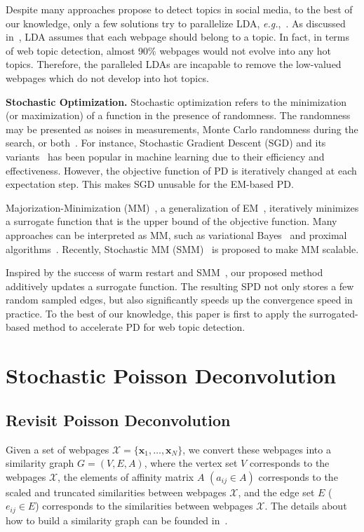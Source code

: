 \documentclass[runningheads]{llncs}
\begin{document}
Despite many approaches propose to detect topics in social media, to the best of our knowledge, only a few solutions try to parallelize LDA, \emph{e.g.},~\cite{wang-2009-PLDA,chen-2015-WarpLDA,Liu-2011-PLDA+}. As discussed in~\cite{pang-2013-unsupervised,pang-tao-2016-lpd}, LDA assumes that each webpage should belong to a topic. In fact, in terms of web topic detection, almost 90\% webpages would not evolve into any hot topics. Therefore, the paralleled LDAs are incapable to remove the low-valued webpages which do not develop into hot topics.

\textbf{Stochastic Optimization.} Stochastic optimization refers to the minimization (or maximization) of a function in the presence of randomness. The randomness may be presented as noises in measurements, Monte Carlo randomness during the search, or both~\cite{hannah-2015-Stochastic}. For instance, Stochastic Gradient Descent (SGD) and its variants~\cite{mairal-2013-optimization,johnson-2013-sgd-accelerating,Roux-2012-sgd-exponential} has been popular in machine learning due to their efficiency and effectiveness. However, the objective function of PD is iteratively changed at each expectation step. This makes SGD unusable for the EM-based PD.

Majorization-Minimization (MM)~\cite{lange-2000-optimization}, a generalization of EM~\cite{cappe-2009-online-EM,neal-1998-view-EM}, iteratively minimizes a surrogate function that is the upper bound of the objective function. Many approaches can be interpreted as MM, such as variational Bayes~\cite{Wainwright-2008-variational-bayes} and proximal algorithms~\cite{beck-2009-fastshrinkage}. Recently, Stochastic MM (SMM)~\cite{mairal-2013-SMM} is proposed to make MM scalable.

Inspired by the success of warm restart and SMM~\cite{mairal-2013-SMM}, our proposed method additively updates a surrogate function. The resulting SPD not only stores a few random sampled edges, but also significantly speeds up the convergence speed in practice. To the best of our knowledge, this paper is first to apply the surrogated-based method to accelerate PD for web topic detection.
%
%
\section{Stochastic Poisson Deconvolution}
\label{sec:coupledframework}
\subsection{Revisit Poisson Deconvolution}
Given a set of webpages $\mathcal{X}=\{\mathbf{x}_1,\ldots,\mathbf{x}_N\}$, we convert these webpages into a similarity graph $G=(V,E,A)$, where the vertex set $V$ corresponds to the webpages $\mathcal{X}$, the elements of affinity matrix $A$ $(a_{ij}\in A)$ corresponds to the scaled and truncated similarities between webpages $\mathcal{X}$, and the edge set $E$ ($e_{ij}\in E$) corresponds to the similarities between webpages $\mathcal{X}$. The details about how to build a similarity graph can be founded in~\cite{pang-tao-2016-lpd}.
\end{document}
